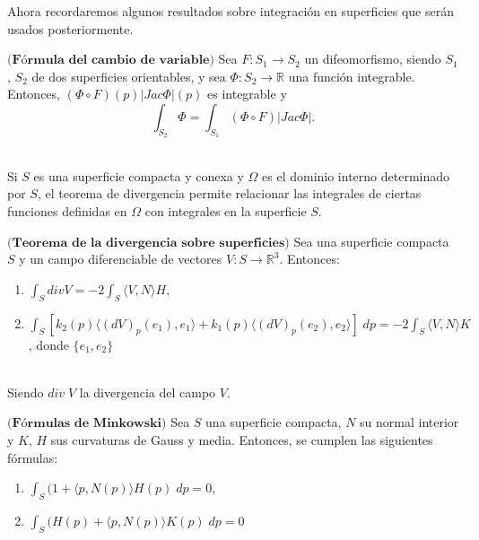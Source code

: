 Ahora recordaremos algunos resultados sobre integración en superficies que serán usados posteriormente.
${}$\\

\begin{teorema}
	$\textbf{(Fórmula del cambio de variable)}$ Sea $F : S_1 \to S_2$ un difeomorfismo, siendo $S_1$, $S_2$ de dos superficies orientables, y sea $\Phi : S_2 \to \mathbb{R}$ una función integrable. Entonces, $(\Phi \circ F)(p)|Jac \Phi|(p)$ es integrable y
	\[
	\int_{S_2} \Phi = \int_{S_1} (\Phi \circ F)|Jac \Phi|.
	\]
\end{teorema}
${ }$\\


Si $S$ es una superficie compacta y conexa y $\Omega$ es el dominio interno determinado por $S$, el teorema de divergencia permite relacionar las integrales de ciertas funciones definidas en $\Omega$ con integrales en la superficie $S$.
${ }$\\

\begin{teorema}\label{teo:divergencia}
	$\textbf{(Teorema de la divergencia sobre superficies)}$ Sea una superficie compacta $S$ y un campo diferenciable de vectores $V : S \to \mathbb{R}^3$. Entonces:
	\begin{enumerate}
		\item $\int_S div V = -2 \int_S \langle V, N \rangle H$,
		\item $\int_S [k_2(p) \langle (dV)_p(e_1), e_1\rangle + k_1(p) \langle (dV)_p(e_2), e_2 \rangle ] \; dp = -2 \int_S \langle V, N \rangle K$, donde $\{ e_1, e_2 \}$
	\end{enumerate}
\end{teorema}
${}$\\

Siendo $div \; V$ la divergencia del campo $V$.
${ }$\\

\begin{teorema}
	$\textbf{(Fórmulas de Minkowski)}$ Sea $S$ una superficie compacta, $N$ su normal interior y $K$, $H$ sus curvaturas de Gauss y media. Entonces, se cumplen las siguientes fórmulas:
	\begin{enumerate}
		\item $\int_S (1 + \langle p, N(p) \rangle H(p) \; dp = 0$,
		\item $\int_S (H(p) + \langle p, N(p) \rangle K(p) \; dp = 0$
	\end{enumerate}
\end{teorema}
${ }$\\








